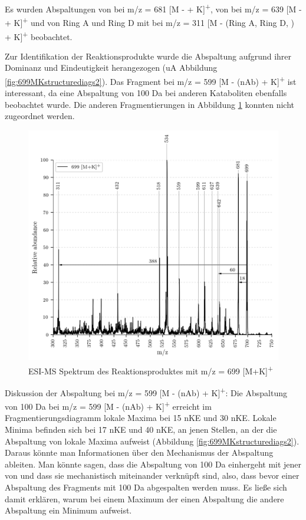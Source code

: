 Es wurden Abspaltungen von  bei m/z = 681 [M -  + K]\textsuperscript{+}, von  bei m/z = 639 [M -  + K]\textsuperscript{+} und von Ring A und Ring D mit  bei m/z = 311 [M - (Ring A, Ring D, ) + K]\textsuperscript{+} beobachtet. 

Zur Identifikation der Reaktionsprodukte wurde die  Abspaltung aufgrund ihrer Dominanz und Eindeutigkeit herangezogen (\gls{uA} Abbildung \ref{fig:699MKstructurediags2}). Das Fragment bei m/z = 599 [M - (\gls{nAb}) + K]\textsuperscript{+} ist interessant, da eine Abspaltung von 100 Da bei anderen Kataboliten ebenfalls beobachtet wurde. Die anderen Fragmentierungen in Abbildung \ref{fig:699MKLeafspray} konnten nicht zugeordnet werden. \\

\begin{figure}[!htbp]
  \centering
  \includegraphics[width=\textwidth, height=0.6\textwidth]{figures/Kapitel4/Kataboliten/VWA_MS_LeafSpray_699.png}
  \caption[ESI-MS Spektrum des Reaktionsproduktes von Bo-DNCC, Quelle: Autor]{ESI-MS Spektrum des Reaktionsproduktes mit m/z = 699 [M+K]\textsuperscript{+}}
  \label{fig:699MKLeafspray}
\end{figure}

Diskussion der Abspaltung bei m/z = 599 [M - (\gls{nAb}) + K]\textsuperscript{+}: Die Abspaltung von 100 Da bei m/z = 599 [M - (\gls{nAb}) + K]\textsuperscript{+} erreicht im Fragmentierungsdiagramm lokale Maxima bei 15 \gls{nKE} und 30 \gls{nKE}. Lokale Minima befinden sich bei 17 \gls{nKE} und 40 \gls{nKE}, an jenen Stellen, an der die Abspaltung von  lokale Maxima aufweist (Abbildung \ref{fig:699MKstructurediags2}). Daraus könnte man Informationen über den Mechanismus der Abspaltung ableiten. Man könnte sagen, dass die Abspaltung von 100 Da einhergeht mit jener von  und dass sie mechanistisch miteinander verknüpft sind, also, dass bevor einer Abspaltung des Fragments mit 100 Da  abgespalten werden muss. Es ließe sich damit erklären, warum bei einem Maximum der einen Abspaltung die andere Abspaltung ein Minimum aufweist.\\ 


